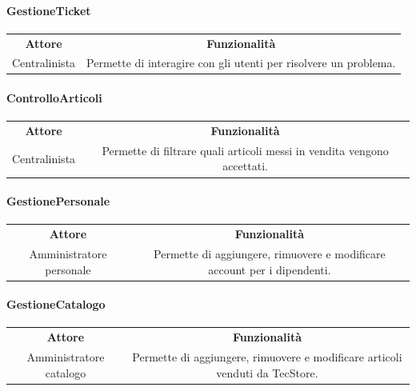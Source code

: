\documentclass[12pt,a4paper]{article}
\begin{document}
\paragraph*{GestioneTicket}
\begin{center}
\begin{tabular}{|c|c|}
\rowcolor[gray]{0.8}
\hline
\textbf{Attore} & \textbf{Funzionalità} \\
Centralinista & Permette di interagire con gli utenti per risolvere un problema. \\
\hline
\end{tabular}
\end{center}

\paragraph*{ControlloArticoli}
\begin{center}
\begin{tabular}{|c|c|}
\rowcolor[gray]{0.8}
\hline
\textbf{Attore} & \textbf{Funzionalità} \\
Centralinista & Permette di filtrare quali articoli messi in vendita vengono accettati. \\
\hline
\end{tabular}
\end{center}

\paragraph*{GestionePersonale}
\begin{center}
\begin{tabular}{|c|c|}
\rowcolor[gray]{0.8}
\hline
\textbf{Attore} & \textbf{Funzionalità} \\
Amministratore personale & Permette di aggiungere, rimuovere e modificare account per i dipendenti. \\
\hline
\end{tabular}
\end{center}

\paragraph*{GestioneCatalogo}
\begin{center}
\begin{tabular}{|c|c|}
\rowcolor[gray]{0.8}
\hline
\textbf{Attore} & \textbf{Funzionalità} \\
Amministratore catalogo & Permette di aggiungere, rimuovere e modificare articoli venduti da TecStore. \\
\hline
\end{tabular}
\end{center}
\end{document}
